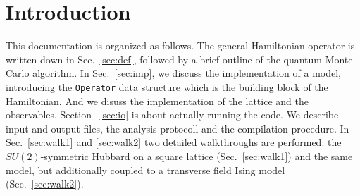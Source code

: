 \section{Introduction}\label{sec:intro}
This documentation is organized as follows. The general Hamiltonian operator is written down in Sec.~\ref{sec:def}, followed by 
a brief outline  of the quantum Monte Carlo algorithm. 
In Sec.~\ref{sec:imp}, we discuss the implementation of a model, introducing the \texttt{Operator} data structure which is the building block of the Hamiltonian. And we disuss the implementation of the lattice and the observables.
Section ~\ref{sec:io} is about actually running the code. We describe input and output files, the analysis protocoll and the compilation procedure. 
In Sec.~\ref{sec:walk1} and \ref{sec:walk2} two detailed walkthroughs are performed: the $SU(2)$-symmetric Hubbard  on a square lattice (Sec.~\ref{sec:walk1}) and the same model, but additionally coupled to a transverse field Ising model (Sec.~\ref{sec:walk2}).


